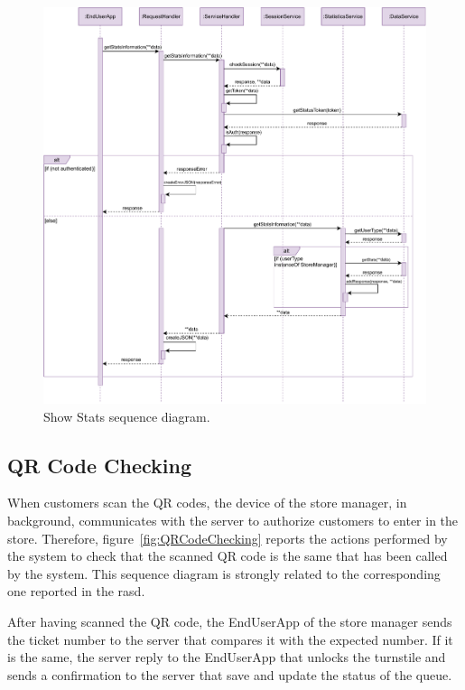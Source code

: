 \begin{figure}[H]
	\centering
	\includegraphics[width=1.0\textwidth]{images/showStats_sequence_diagram.pdf}
	\caption{Show Stats sequence diagram.}\label{fig:ShowStats}
\end{figure}

\subsection{QR Code Checking}

When customers scan the QR codes, the device of the store manager, in background, communicates with the server to authorize customers to enter in the store. Therefore, figure~\ref{fig:QRCodeChecking} reports the actions performed by the system to check that the scanned QR code is the same that has been called by the system.
This sequence diagram is strongly related to the corresponding one reported in the \gls{rasd}.

After having scanned the QR code, the EndUserApp of the store manager sends the ticket number to the server that compares it with the expected number.
If it is the same, the server reply to the EndUserApp that unlocks the turnstile and sends a confirmation to the server that save and update the status of the queue.

